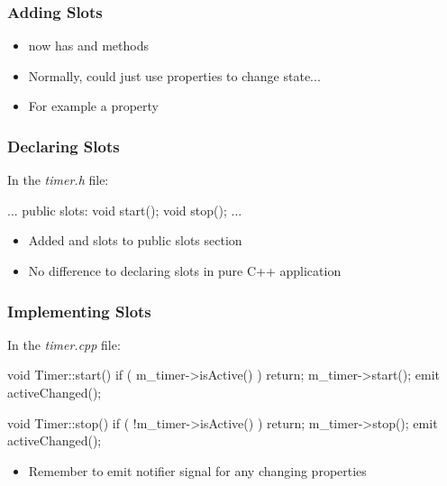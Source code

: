 
\begin{slide}[fragile]\frametitle{Adding Slots}
\begin{itemize}
\item {} now has  and  methods
\item Normally, could just use properties to change state...
\item For example a  property
\end{itemize}


\end{slide}


\begin{slide}[fragile]\frametitle{Declaring Slots}

In the \textit{timer.h} file:

\vspace*{0.25em}
\begin{cpp}
...
public slots:
    void start();
    void stop();
...
\end{cpp}

\begin{itemize}
\item Added  and  slots to public slots section
\item No difference to declaring slots in pure C++ application
\end{itemize}

\end{slide}



\begin{slide}[fragile]\frametitle{Implementing Slots}

In the \textit{timer.cpp} file:

\vspace*{0.25em}
\begin{cpp}
void Timer::start() {
    if ( m_timer->isActive() )
        return;
    m_timer->start();
    emit activeChanged();
}

void Timer::stop() {
    if ( !m_timer->isActive() )
        return;
    m_timer->stop();
    emit activeChanged();
}
\end{cpp}

\begin{itemize}
\item Remember to emit notifier signal for any changing properties
\end{itemize}

\end{slide}


